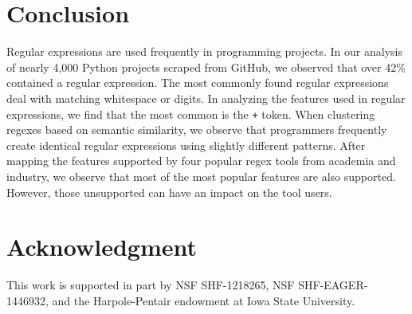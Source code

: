 \documentclass[conference]{IEEEtran}
\begin{document}
\section{Conclusion}
\label{sec:conclusion}
Regular expressions are used frequently in programming projects. In our analysis of nearly 4,000 Python projects scraped from GitHub, we observed that over 42\% contained a regular expression. The most commonly found regular expressions deal with matching whitespace or digits.
In analyzing the features used in regular expressions, we find that the most common is the {\tt +} token.
When clustering regexes based on semantic similarity, we observe that programmers frequently create identical regular expressions using slightly different patterns. After mapping the features supported by four popular regex tools from academia and industry, we observe that most of the most popular features are also supported. However, those  unsupported can have an impact on the tool users.

\section*{Acknowledgment}
This work is supported in part by NSF SHF-1218265, NSF SHF-EAGER-1446932, and the Harpole-Pentair endowment at Iowa State University.




\balance




\end{document}
